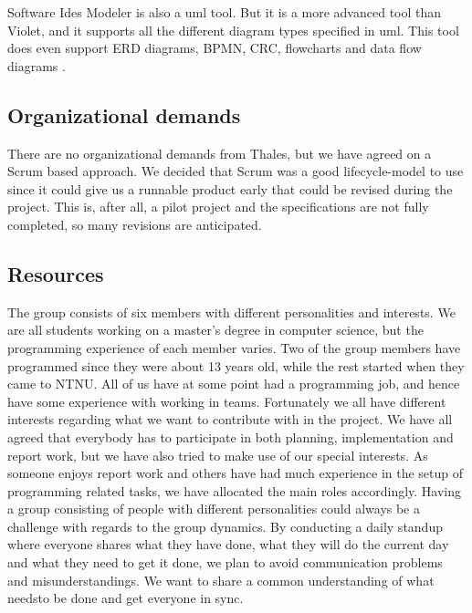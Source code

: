 Software Ides Modeler is also a \gls{uml} tool. But it is a more advanced tool than Violet, and it supports all the different diagram types specified in \gls{uml}. This tool does even support ERD diagrams, BPMN, CRC, flowcharts and data flow diagrams \cite{bib:sim}.

\pagebreak

\subsection{Organizational demands}
There are no organizational demands from Thales, but we have agreed on a Scrum based approach. We decided that Scrum was a good lifecycle-model to use since it could give us a runnable product early that could be revised during the project. This is, after all, a pilot project and the specifications are not fully completed, so many revisions are anticipated.

\subsection{Resources}
The group consists of six members with different personalities and interests. We are all students working on a master's degree in computer science, but the programming experience of each member varies. Two of the group members have programmed since they were about 13 years old, while the rest started when they came to NTNU. All of us have at some point had a programming job, and hence have some experience with working in teams.
\newline
\newline
Fortunately we all have different interests regarding what we want to contribute with in the project. We have all agreed that everybody has to participate in both planning, implementation and report work, but we have also tried to make use of our special interests. As someone enjoys report work and others have had much experience in the setup of programming related tasks, we have allocated the main roles accordingly.
\newline
\newline
Having a group consisting of people with different personalities could always be a challenge with regards to the group dynamics. By conducting a daily standup where everyone shares what they have done, what they will do the current day and what they need to get it done, we plan to avoid communication problems and misunderstandings. We want to share a common understanding of what needsto be done and get everyone in sync. 

